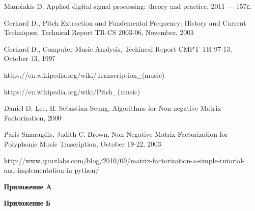 \documentclass[oneside, final, 14pt]{extarticle}
\begin{document}
\cleardoublepage
{}
\begin{thebibliography}{0}

   Manolakis D. Applied digital signal
    processing: theory and practice, 2011 --- 157с.


   Gerhard D., Pitch Extraction and Fundemental Frequency:
    History and Current Techniques, Technical Report TR-CS 2003-06, November, 2003

   Gerhard D., Computer Music Analysis, Techincal Report CMPT
    TR 97-13, October 13, 1997

   https://en.wikipedia.org/wiki/Transcription\_(music)

   https://en.wikipedia.org/wiki/Pitch\_(music)

   Daniel D. Lee, H. Sebastian Seung,
  Algorithms for Non-negative Matrix Factorization, 2000

   Paris Smaragdis, Judith C. Brown,
    Non-Negative Matrix Factorization
    for Polyphonic Music Trascription, October 19-22, 2003

   http://www.quuxlabs.com/blog/2010/09/matrix-factorization-a-simple-tutorial-and-implementation-in-python/

\end{thebibliography}

\cleardoublepage
\appendix
{\large \bf Приложение A} \\

{\large \bf Приложение Б} \\
\end{document}
